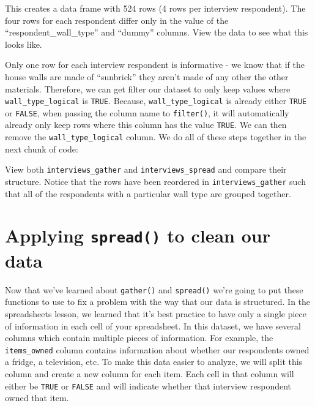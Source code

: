 \documentclass[]{book}
\newenvironment{Shaded}{\begin{snugshade}}{\end{snugshade}}
\newcommand{\KeywordTok}[1]{\textcolor[rgb]{0.13,0.29,0.53}{\textbf{#1}}}
\newcommand{\DataTypeTok}[1]{\textcolor[rgb]{0.13,0.29,0.53}{#1}}
\newcommand{\StringTok}[1]{\textcolor[rgb]{0.31,0.60,0.02}{#1}}
\newcommand{\OperatorTok}[1]{\textcolor[rgb]{0.81,0.36,0.00}{\textbf{#1}}}
\newcommand{\NormalTok}[1]{#1}
\begin{document}
This creates a data frame with 524 rows (4 rows per interview
respondent). The four rows for each respondent differ only in the value
of the ``respondent\_wall\_type'' and ``dummy'' columns. View the data
to see what this looks like.

Only one row for each interview respondent is informative - we know that
if the house walls are made of ``sunbrick'' they aren't made of any
other the other materials. Therefore, we can get filter our dataset to
only keep values where \texttt{wall\_type\_logical} is \texttt{TRUE}.
Because, \texttt{wall\_type\_logical} is already either \texttt{TRUE} or
\texttt{FALSE}, when passing the column name to \texttt{filter()}, it
will automatically already only keep rows where this column has the
value \texttt{TRUE}. We can then remove the \texttt{wall\_type\_logical}
column. We do all of these steps together in the next chunk of code:

\begin{Shaded}
\end{Shaded}

View both \texttt{interviews\_gather} and \texttt{interviews\_spread}
and compare their structure. Notice that the rows have been reordered in
\texttt{interviews\_gather} such that all of the respondents with a
particular wall type are grouped together.

\section{\texorpdfstring{Applying \texttt{spread()} to clean our
data}{Applying spread() to clean our data}}\label{applying-spread-to-clean-our-data}

Now that we've learned about \texttt{gather()} and \texttt{spread()}
we're going to put these functions to use to fix a problem with the way
that our data is structured. In the spreadsheets lesson, we learned that
it's best practice to have only a single piece of information in each
cell of your spreadsheet. In this dataset, we have several columns which
contain multiple pieces of information. For example, the
\texttt{items\_owned} column contains information about whether our
respondents owned a fridge, a television, etc. To make this data easier
to analyze, we will split this column and create a new column for each
item. Each cell in that column will either be \texttt{TRUE} or
\texttt{FALSE} and will indicate whether that interview respondent owned
that item.
\end{document}
